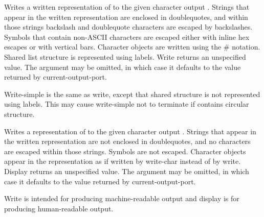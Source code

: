 \begin{entry}{%
}

Writes a written representation of  to the given character output
.  Strings
that appear in the written representation are enclosed in doublequotes, and
within those strings backslash and doublequote characters are
escaped by backslashes.  Symbols that contain non-ASCII characters
are escaped either with inline hex escapes or with vertical bars.
Character objects are written using the {\cf \#\backwhack} notation.
Shared list structure is represented using labels.
{\cf Write} returns an unspecified value.  The
 argument may be omitted, in which case it defaults to the value
returned by {\cf current-output-port}.

\end{entry}

\begin{entry}{%
}

{\cf Write-simple} is the same as {\cf write}, except that shared structure is
not represented using labels.  This may cause {\cf write-simple} not to
terminate if  contains circular structure.

\end{entry}


\begin{entry}{%
}

Writes a representation of  to the given character output .
Strings that appear in the written representation are not enclosed in
doublequotes, and no characters are escaped within those strings.  
Symbols are not escaped.  Character
objects appear in the representation as if written by {\cf write-char}
instead of by {\cf write}.  {\cf Display} returns an unspecified value.
The  argument may be omitted, in which case it defaults to the
value returned by {\cf current-output-port}.

\begin{rationale}
{\cf Write} is intended
for producing mach\-ine-readable output and {\cf display} is for producing
human-readable output.  
\end{rationale}
\end{entry}


